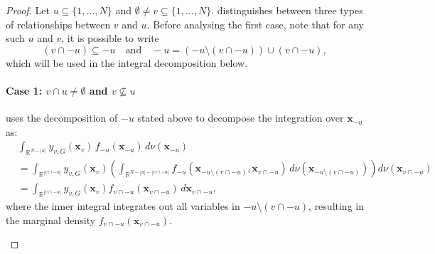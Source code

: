 \begin{proof}
Let $u \subseteq \{1,\dots,N\}$ and $\emptyset \ne v \subseteq \{1,\dots,N\}$.
\citet{rahman2014} distinguishes between three types of relationships between $v$ and $u$.
Before analysing the first case, note that for any such $u$ and $v$, it is possible to write
\[
(v \cap -u) \subseteq -u \quad \text{and} \quad -u = (-u \setminus (v \cap -u)) \cup (v \cap -u),
\]
which will be used in the integral decomposition below.
\paragraph{Case 1: \( v \cap u \ne \emptyset \) and \( v \not\subseteq u \)}
\citet{rahman2014} uses the decomposition of $-u$ stated above to decompose the integration over $\boldsymbol{x}_{-u}$ as:
\begin{equation*}
\begin{aligned}
&\int_{\mathbb{R}^{N - |u|}} 
    y_{v,G}(\boldsymbol{x}_v)\,
    f_{-u}(\boldsymbol{x}_{-u}) 
    \, d \nu(\boldsymbol{x}_{-u}) \\[3ex]
&= \int_{\mathbb{R}^{|v \cap -u|}} 
    y_{v,G}(\boldsymbol{x}_v)
    \left(
        \int_{\mathbb{R}^{N - |u| - |v \cap -u|}}
            f_{-u}(\boldsymbol{x}_{-u \setminus (v \cap -u)}, \boldsymbol{x}_{v \cap -u})
            \, d \nu(\boldsymbol{x}_{-u \setminus (v \cap -u)})
    \right) 
    d \nu(\boldsymbol{x}_{v \cap -u}) \\[3ex]
    &= \int_{\mathbb{R}^{|v \cap -u|}} y_{v,G}(\boldsymbol{x}_v) f_{v \cap -u}(\boldsymbol{x}_{v \cap -u}) \, d\boldsymbol{x}_{v \cap -u},
\end{aligned}
\end{equation*}
where the inner integral integrates out all variables in 
$-u \setminus (v \cap -u)$, 
resulting in the marginal density 
$f_{v \cap -u}(\boldsymbol{x}_{v \cap -u})$.
\begin{center}
\end{center}

\end{proof}
